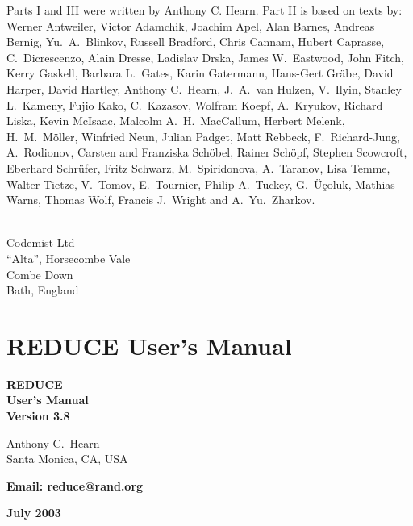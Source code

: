 \documentclass[11pt,letterpaper]{book}
\newcommand{\REDUCE}{REDUCE}
\begin{document}
Parts I and III were written by Anthony C. Hearn.  Part II is based on
texts by:\\
Werner Antweiler,
Victor Adamchik,
Joachim Apel,
Alan Barnes,
Andreas Bernig,
Yu.~A.~Blinkov,
Russell Bradford,
Chris Cannam,
Hubert Caprasse,
C.~{Dicrescenzo},
Alain Dresse,
Ladislav Drska,
James W.~Eastwood,
John Fitch,
Kerry Gaskell,
Barbara L.~Gates,
Karin Gatermann,
Hans-Gert Gr\"abe,
David Harper,
David {H}artley,
Anthony C.~Hearn,
J.~A.~van Hulzen,
V.~Ilyin,
Stanley L.~Kameny,
Fujio Kako,
C.~Kazasov,
Wolfram Koepf,
A.~Kryukov,
Richard Liska,
Kevin McIsaac,
Malcolm A.~H.~MacCallum,
Herbert Melenk,
H.~M.~M\"oller,
Winfried Neun,
Julian Padget,
Matt Rebbeck,
F.~Richard-Jung,
A.~Rodionov,
Carsten and Franziska Sch\"obel,
{Rainer} Sch\"opf,
Stephen Scowcroft,
Eberhard Schr\"{u}fer,
Fritz Schwarz,
M.~Spiridonova,
A.~Taranov,
Lisa Temme,
Walter Tietze,
V.~Tomov,
E.~Tournier,
Philip A.~Tuckey,
G.~\"{U}\c{c}oluk,
Mathias Warns,
Thomas Wolf,
Francis J.~Wright
and
A.~Yu.~Zharkov.

\noindent
{} \\
Codemist Ltd \\
``Alta'', Horsecombe Vale \\
Combe Down \\
Bath, England
\newpage
\tableofcontents
\part{{\REDUCE} User's Manual}

\vspace*{2.0in}
\begin{center}

{\Huge\bf {\REDUCE}} \\ [0.2cm]
{\LARGE\bf User's Manual\vspace{0.4cm} \\
  Version 3.8}

\vspace{0.5in}\large\bf

Anthony C.\ Hearn \\
Santa Monica, CA, USA

\vspace{0.1in}

\bf Email: reduce@rand.org

\vspace{0.5in}

\large\bf July 2003

\end{center}
\end{document}
